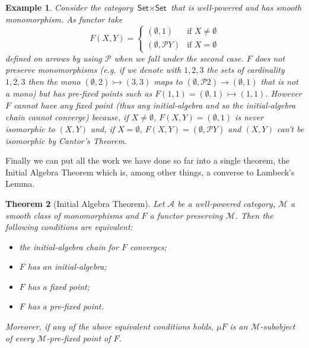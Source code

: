 \documentclass[letterpaper, 11pt, oneside]{memoir}
\theoremstyle{myteo}
\newtheorem{theorem}{Theorem}[section]
\newtheorem{example}[theorem]{Example}
\numberwithin{equation}{section}
\newcommand{\Set}{\textsf{Set}}
\newcommand{\A}{\mathscr{A}}
\begin{document}
\begin{example}
  Consider the category \(\Set \times \Set\) that is well-powered and has smooth monomorphism.
  As functor take
  \begin{equation*}
    F(X, Y) = \begin{cases}
      (\emptyset, 1) & \text{if } X \neq \emptyset \\
      (\emptyset, \mathcal{P}Y) & \text{if } X = \emptyset
    \end{cases}
  \end{equation*}
  defined on arrows by using \(\mathcal{P}\) when we fall under the second case.
  \(F\) does not preserve monomorphisms (e.g. if we denote with \(1, 2, 3\) the sets of cardinality \(1, 2, 3\) then the mono \((\emptyset, 2) \rightarrowtail (3, 3)\) maps to \((\emptyset, \mathcal{P}2) \to (\emptyset, 1)\) that is not a mono) but has pre-fixed points such as \(F(1, 1) = (\emptyset, 1) \rightarrowtail (1, 1)\).
  However \(F\) cannot have any fixed point (thus any initial-algebra and so the initial-algebra chain cannot converge) because, if \(X \neq \emptyset\), \(F(X, Y) = (\emptyset, 1)\) is never isomorphic to \((X, Y)\) and, if \(X = \emptyset\), \(F(X, Y) = (\emptyset, \mathcal{P}Y)\) and \((X, Y)\) can't be isomorphic by Cantor's Theorem. 
\end{example}

Finally we can put all the work we have done so far into a single theorem, the Initial Algebra Theorem which is, among other things, a converse to Lambeck's Lemma.

\begin{theorem}[Initial Algebra Theorem]
  \label{teo:initial-algebra-theorem}
  Let \(\A\) be a well-powered category, \(\mathcal{M}\) a smooth class of monomorphisms and \(F\) a functor preserving \(\mathcal{M}\).
  Then the following conditions are equivalent:
  \begin{itemize}
  \item[1.] the initial-algebra chain for \(F\) converges;
  \item[2.] \(F\) has an initial-algebra;
  \item[3.] \(F\) has a fixed point;
  \item[4.] \(F\) has a pre-fixed point.
  \end{itemize}
  Moreover, if any of the above equivalent conditions holds, \(\mu F\) is an \(\mathcal{M}\)-subobject of every \(\mathcal{M}\)-pre-fixed point of \(F\).
\end{theorem}
\end{document}
